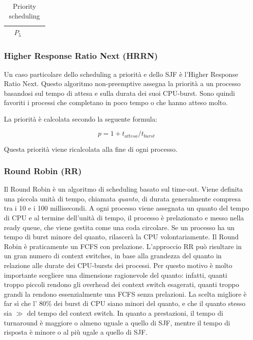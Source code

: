 \documentclass[a4paper]{article}
\begin{document}
\begin{table}[h]
\begin{tabular}{|c|ccccc|cccccccccc|ccc|c|}
                                                             & \multicolumn{5}{c|}{\cellcolor[HTML]{656565}$P_5$} & \multicolumn{10}{c|}{}                              & \multicolumn{3}{c|}{}                              &                                                                                                     \\ \hline
    \end{tabular}
    \caption{Priority scheduling}
\end{table}


\subsubsection{Higher Response Ratio Next (HRRN)}
Un caso particolare dello scheduling a priorità e dello SJF è l'Higher Response Ratio Next. Questo algoritmo non-preemptive assegna la priorità a un processo basandosi sul tempo di attesa e sulla durata dei suoi CPU-burst. Sono quindi favoriti i processi che completano in poco tempo o che hanno atteso molto.

La priorità è calcolata secondo la seguente formula:

$$
    p = 1 + t_{attesa}/t_{burst}
$$

Questa priorità viene ricalcolata alla fine di ogni processo.

\subsubsection{Round Robin (RR)}
Il Round Robin è un algoritmo di scheduling basato sul time-out. Viene definita una piccola unità di tempo, chiamata \textit{quanto}, di durata generalmente compresa tra i 10 e i 100 millisecondi. A ogni processo viene assegnata un quanto del tempo di CPU e al termine dell'unità di tempo, il processo è prelazionato e messo nella ready queue, che viene gestita come una coda circolare. Se un processo ha un tempo di burst minore del quanto, rilascerà la CPU volontariamente. Il Round Robin è praticamente un FCFS con prelazione.
L'approccio RR può risultare in un gran numero di context switches, in base alla grandezza del quanto in relazione alle durate dei CPU-bursts dei processi. Per questo motivo è molto importante scegliere una dimensione ragionevole del quanto: infatti, quanti troppo piccoli rendono gli overhead dei context switch esagerati, quanti troppo grandi la rendono essenzialmente una FCFS senza prelazioni. La scelta migliore è far sì che l' 80\% dei burst di CPU siano minori del quanto, e che il quanto stesso sia $\gg$ del tempo del context switch.\newline
In quanto a prestazioni, il tempo di turnaround è maggiore o almeno uguale a quello di SJF, mentre il tempo di risposta è minore o al più ugale a quello di SJF.
\end{document}
